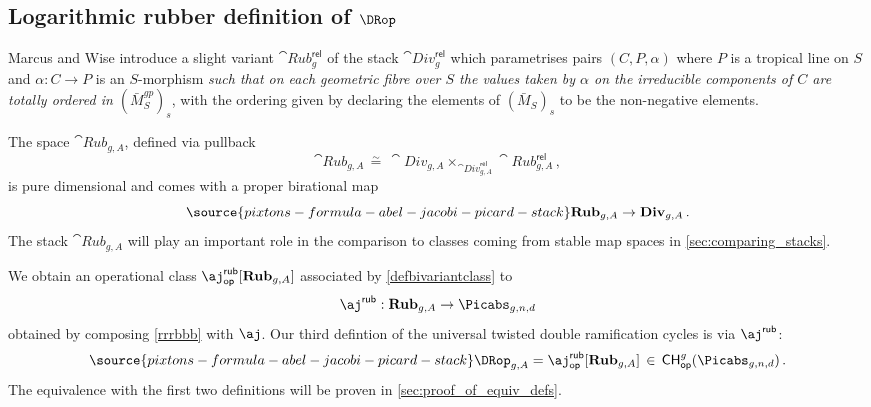 

\subsection{Logarithmic rubber definition of \texorpdfstring{$\DRop$}{DR\^{}op}}\label{sec:rub_log_def}
Marcus and Wise introduce a slight variant $\cat{Rub}^{\mathsf{rel}}_{g}$ of the stack $\cat{Div}^{\mathsf{rel}}_{g}$
which
parametrises pairs $(C,P, \alpha)$ where $P$ is a tropical line on $S$ and $\alpha\colon C \to P$ is an $S$-morphism \emph{such that on each geometric fibre over $S$ the values taken by $\alpha$ on the irreducible components of $C$ are totally ordered in $(\bar{M}_S^{gp})_s$}, with the ordering given by declaring the elements of $(\bar{M}_S)_s$ to be the non-negative elements.

The space $\cat{Rub}_{g,A}$,
defined via pullback
$$
\cat{Rub}_{g,A} \, \stackrel{\sim}{=}\,
\cat{Div}_{g,A}
\times_{\cat{Div}^{\mathsf{rel}}
_{g,A}}
\cat{Rub}^{\mathsf{rel}}_{g,A}\, ,$$
is pure dimensional and comes with a proper birational map
\begin{equation}\label{rrrbbb}
\source{pixtons-formula-abel-jacobi-picard-stack}
\cat{Rub}_{g,A} \to \cat{Div}_{g,A}\, .
\end{equation}
The stack $\cat{Rub}_{g,A}$  will
play an important role in the comparison to classes coming from stable map spaces in \cref{sec:comparing_stacks}.


We obtain an operational class $\aj^{\mathsf{rub}}_{\mathsf{op}}[\cat{Rub}_{g,A}]$ associated by \cref{defbivariantclass} to
$$\aj^{\mathsf{rub}}: \cat{Rub}_{g,A} \to \Picabs_{g,n,d}$$
obtained by composing \eqref{rrrbbb} with $\aj$.
Our third defintion of the universal twisted double ramification
cycles is via $\aj^{\mathsf{rub}}$:
\begin{equation}%
\source{pixtons-formula-abel-jacobi-picard-stack}
\DRop_{g,A} = \aj^{\mathsf{rub}}_{\mathsf{op}}[\cat{Rub}_{g,A}] \, \in\,
\mathsf{CH}^g_{\mathsf{op}}(\Picabs_{g,n,d})
\, .
\end{equation}
The equivalence with the first two
definitions will be proven in \cref{sec:proof_of_equiv_defs}.


